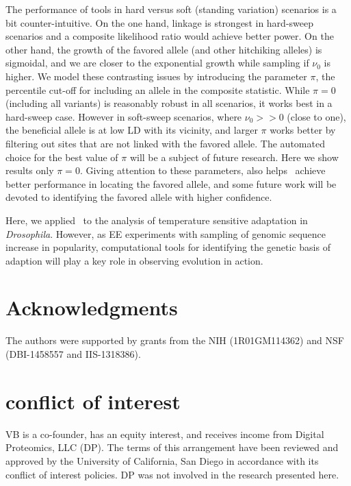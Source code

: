 \documentclass[11pt]{article}
\def\comale{\text{{\sc Comale}}}
\begin{document}
The performance of tools in hard versus soft (standing variation)
scenarios is a bit counter-intuitive. On the one hand, linkage is
strongest in hard-sweep scenarios and a composite likelihood ratio
would achieve better power. On the other hand, the growth of the
favored allele (and other hitchiking alleles) is sigmoidal, and we are
closer to the exponential growth while sampling if $\nu_0$ is
higher. We model these contrasting issues by introducing the parameter
$\pi$, the percentile cut-off for including an allele in the composite
statistic. While $\pi=0$ (including all variants) is reasonably robust
in all scenarios, it works best in a hard-sweep case. However in
soft-sweep scenarios, where $\nu_0>>0$ (close to one), the beneficial
allele is at low LD with its vicinity, and larger $\pi$ works better
by filtering out sites that are not linked with the favored
allele. The automated choice for the best value of $\pi$ will be a
subject of future research. Here we show results only $\pi=0$. Giving
attention to these parameters, also helps \comale\ achieve better
performance in locating the favored allele, and some future work will
be devoted to identifying the favored allele with higher confidence.

Here, we applied \comale\ to the analysis of temperature sensitive
adaptation in \emph{Drosophila}. However, as EE experiments with
sampling of genomic sequence increase in popularity, computational
tools for identifying the genetic basis of adaption will play a key
role in observing evolution in action.
	



\section*{Acknowledgments}
The authors were supported by grants from the NIH (1R01GM114362) and
NSF (DBI-1458557 and IIS-1318386).

\section*{conflict of interest}
VB is a co-founder, has an equity interest, and receives income from
Digital Proteomics, LLC (DP).  The terms of this arrangement have been
reviewed and approved by the University of California, San Diego in
accordance with its conflict of interest policies.  DP was not
involved in the research presented here.
\end{document}
